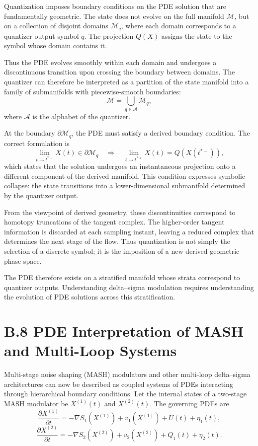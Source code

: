 Quantization imposes boundary conditions on the PDE solution that are fundamentally geometric. The state does not evolve on the full manifold \(\mathcal{M}\), but on a collection of disjoint domains \(\mathcal{M}_{q}\), where each domain corresponds to a quantizer output symbol \(q\). The projection \(Q(X)\) assigns the state to the symbol whose domain contains it.

Thus the PDE evolves smoothly within each domain and undergoes a discontinuous transition upon crossing the boundary between domains. The quantizer can therefore be interpreted as a partition of the state manifold into a family of submanifolds with piecewise-smooth boundaries:
\[
\mathcal{M} = \bigcup_{q\in\mathcal{A}} \overline{\mathcal{M}_{q}},
\]
where \(\mathcal{A}\) is the alphabet of the quantizer.

At the boundary \(\partial\mathcal{M}_{q}\), the PDE must satisfy a derived boundary condition. The correct formulation is
\[
\lim_{t\to t^{\ast -}} X(t) \in \partial\mathcal{M}_{q} 
\quad \Longrightarrow \quad
\lim_{t\to t^{\ast +}} X(t) = Q(X(t^{\ast -})),
\]
which states that the solution undergoes an instantaneous projection onto a different component of the derived manifold. This condition expresses symbolic collapse: the state transitions into a lower-dimensional submanifold determined by the quantizer output.

From the viewpoint of derived geometry, these discontinuities correspond to homotopy truncations of the tangent complex. The higher-order tangent information is discarded at each sampling instant, leaving a reduced complex that determines the next stage of the flow. Thus quantization is not simply the selection of a discrete symbol; it is the imposition of a new derived geometric phase space.

The PDE therefore exists on a stratified manifold whose strata correspond to quantizer outputs. Understanding delta–sigma modulation requires understanding the evolution of PDE solutions across this stratification.

\section{B.8 PDE Interpretation of MASH and Multi-Loop Systems}

Multi-stage noise shaping (MASH) modulators and other multi-loop delta–sigma architectures can now be described as coupled systems of PDEs interacting through hierarchical boundary conditions. Let the internal states of a two-stage MASH modulator be \(X^{(1)}(t)\) and \(X^{(2)}(t)\). The governing PDEs are
\[
\frac{\partial X^{(1)}}{\partial t} = -\nabla S_{1}(X^{(1)}) + v_{1}(X^{(1)}) + U(t) + \eta_{1}(t),
\]
\[
\frac{\partial X^{(2)}}{\partial t} = -\nabla S_{2}(X^{(2)}) + v_{2}(X^{(2)}) + Q_{1}(t) + \eta_{2}(t).
\]

